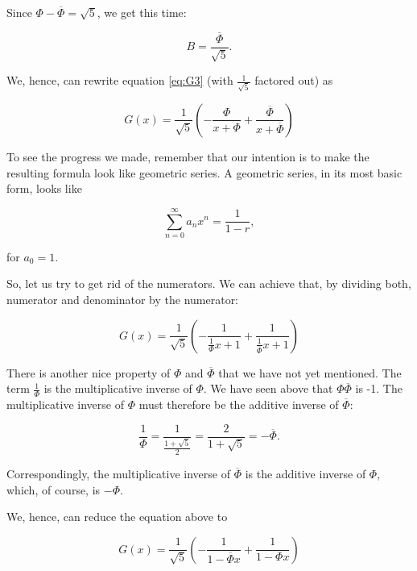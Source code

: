 \documentclass[tikz]{scrreprt}
\begin{document}
Since $\Phi-\overline{\Phi} = \sqrt{5}$, we get this time:

\begin{equation}
B = \frac{\overline{\Phi}}{\sqrt{5}}.
\end{equation}

We, hence, can rewrite equation \ref{eq:G3} 
(with $\frac{1}{\sqrt{5}}$ factored out) as

\begin{equation}\label{eq:G4}
G(x) = \frac{1}{\sqrt{5}}\left(
       -\frac{\Phi}{x+\Phi} + 
       \frac{\overline{\Phi}}{x+\overline{\Phi}}\right)
\end{equation}

To see the progress we made, remember that our intention is
to make the resulting formula look like geometric series.
A geometric series, in its most basic form, looks like

\begin{equation}
\sum_{n=0}^{\infty}{a_nx^n} = \frac{1}{1-r},
\end{equation}

for $a_0 = 1$.

So, let us try to get rid of the numerators.
We can achieve that, by dividing both,
numerator and denominator by the numerator:

\begin{equation}
G(x) = \frac{1}{\sqrt{5}}\left(
       -\frac{1}{\frac{1}{\Phi}x+1} + 
       \frac{1}{\frac{1}{\overline{\Phi}}x+1}\right)
\end{equation}

There is another nice property of $\Phi$ and $\overline{\Phi}$
that we have not yet mentioned.
The term $\frac{1}{\Phi}$ is the multiplicative inverse of $\Phi$.
We have seen above that $\Phi\overline{\Phi}$ is -1.
The multiplicative inverse of $\Phi$ must therefore be
the additive inverse of $\overline{\Phi}$:

\begin{equation}
\frac{1}{\Phi} = \frac{1}{\frac{1+\sqrt{5}}{2}} =
\frac{2}{1+\sqrt{5}} = -\overline{\Phi}.
\end{equation}

Correspondingly, the multiplicative inverse of $\overline{\Phi}$
is the additive inverse of $\Phi$, which, of course, is $-\Phi$.

We, hence, can reduce the equation above to

\begin{equation}
G(x) = \frac{1}{\sqrt{5}}\left(
       -\frac{1}{1-\overline{\Phi}x} + 
       \frac{1}{1-{\Phi}x}\right)
\end{equation}
\end{document}
